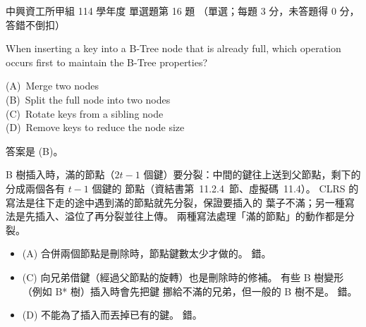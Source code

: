 \begin{pastexam}[label={px:nchu-114-dsa-16}]{中興資工所甲組 114 學年度 單選題第 16 題}
（單選；每題 3 分，未答題得 0 分，答錯不倒扣）

When inserting a key into a B-Tree node that is already full, which operation occurs first to maintain the B-Tree properties?

(A)~Merge two nodes\\
(B)~Split the full node into two nodes\\
(C)~Rotate keys from a sibling node\\
(D)~Remove keys to reduce the node size
\end{pastexam}

\begin{pastsoln}
答案是 (B)。

B 樹插入時，滿的節點（$2t - 1$ 個鍵）要分裂：中間的鍵往上送到父節點，剩下的分成兩個各有 $t - 1$ 個鍵的
節點（資結書第~11.2.4~節、虛擬碼~11.4）。 CLRS 的寫法是往下走的途中遇到滿的節點就先分裂，保證要插入的
葉子不滿；另一種寫法是先插入、溢位了再分裂並往上傳。 兩種寫法處理「滿的節點」的動作都是分裂。
\begin{itemize}
\item (A) 合併兩個節點是刪除時，節點鍵數太少才做的。 錯。
\item (C) 向兄弟借鍵（經過父節點的旋轉）也是刪除時的修補。 有些 B 樹變形（例如 B* 樹）插入時會先把鍵
挪給不滿的兄弟，但一般的 B 樹不是。 錯。
\item (D) 不能為了插入而丟掉已有的鍵。 錯。
\end{itemize}
\end{pastsoln}

